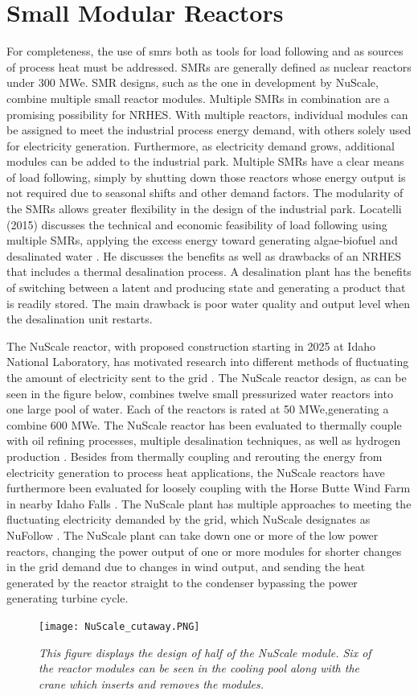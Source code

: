 \documentclass[12pt]{UIdahoMastersThesis}
\begin{document}
\section{Small Modular Reactors}
For completeness, the use of \ac{smrs} both as tools for load following and as sources of process heat must be addressed. SMRs are generally defined as nuclear reactors under 300 MWe. SMR designs, such as the one in development by NuScale, combine multiple small reactor modules. Multiple SMRs in combination are a promising possibility for NRHES.  With multiple reactors, individual modules can be assigned to meet the industrial process energy demand, with others solely used for electricity generation. Furthermore, as electricity demand grows, additional modules can be added to the industrial park. Multiple SMRs have a clear means of load following, simply by shutting down those reactors whose energy output is not required due to seasonal shifts and other demand factors. The modularity of the SMRs allows greater flexibility in the design of the industrial park.  Locatelli (2015) discusses the technical and economic feasibility of load following using multiple SMRs, applying the excess energy toward generating algae-biofuel and desalinated water \cite{Locatelli2015}. He discusses the benefits as well as drawbacks of an NRHES that includes a thermal desalination process. A desalination plant has the benefits of switching between a latent and producing state and generating a product that is readily stored. The main drawback is poor water quality and output level when the desalination unit restarts.

The NuScale reactor, with proposed construction starting in 2025 at Idaho National Laboratory, has motivated research into different methods of fluctuating the amount of electricity sent to the grid \cite{Ingersoll2014, Ingersoll2015, Ingersoll2016, Ingersoll2014_1}. The NuScale reactor design, as can be seen in the figure below, combines twelve small pressurized water reactors into one large pool of water.  Each of the reactors is rated at 50 MWe,generating a combine 600 MWe. The NuScale reactor has been evaluated to thermally couple with oil refining processes, multiple desalination techniques, as well as hydrogen production \cite{Ingersoll2014}. Besides from thermally coupling and rerouting the energy from electricity generation to process heat applications, the NuScale reactors have furthermore been evaluated for loosely coupling with the Horse Butte Wind Farm in nearby Idaho Falls \cite{Ingersoll2015}.  The NuScale plant has multiple approaches to meeting the fluctuating electricity demanded by the grid, which NuScale designates as NuFollow \cite{Ingersoll2015}.  The NuScale plant can take down one or more of the low power reactors, changing the power output of one or more modules for shorter changes in the grid demand due to changes in wind output, and sending the heat generated by the reactor straight to the condenser bypassing the power generating turbine cycle.
\begin{figure}[h!]
\texttt{[image: NuScale\_cutaway.PNG]}
\caption{\small \sl This figure displays the design of half of the NuScale module. Six of the reactor modules can be seen in the cooling pool along with the crane which inserts and removes the modules.}
\end{figure}
\end{document}
